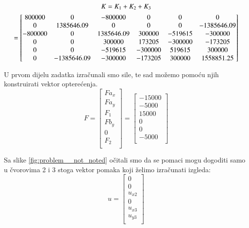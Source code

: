 \documentclass[a4paper,twoside,12pt]{memoir} %
\begin{document}
\begin{gather}
\label{eq:globalna_matrica_krutosti}
    K = K_1 + K_2 + K_3 \notag \\ 
    =
    \begin{bmatrix}
    800000 & 0 & -800000 & 0 & 0 & 0 \\
    0 & 1385646.09 & 0 & 0 & 0 & -1385646.09 \\
    -800000 & 0 & 1385646.09 & 300000 & -519615 & -300000 \\
    0 & 0 & 300000 & 173205 & -300000 & -173205 \\
    0 & 0 & -519615 & -300000 & 519615 & 300000 \\
    0 & -1385646.09 & -300000 & -173205 & 300000 & 1558851.25 \\
    \end{bmatrix}
\end{gather}


U prvom dijelu zadatka izračunali smo sile, te sad možemo pomoću njih konstruirati vektor opterećenja.
\begin{equation}
\label{eq:vektor_opterecenja}
    F =
    \begin{bmatrix}
    Fa_x \\ Fa_y \\ F_1 \\ Fb_y \\ 0 \\ F_2 \\
    \end{bmatrix}
    =
    \begin{bmatrix}
    -15000 \\ -5000 \\ 15000 \\ 0 \\ 0 \\ -5000 \\
    \end{bmatrix}
\end{equation}

Sa slike \ref{fig:problem__not_noted} očitali smo da se pomaci mogu dogoditi samo u čvorovima 2 i 3 stoga vektor pomaka koji želimo izračunati izgleda:
\begin{equation}
\label{eq:vektor_pomaka}
    u =
    \begin{bmatrix}
    0 \\ 0 \\ u_{x2} \\ 0 \\ u_{x3} \\ u_{y3} \\
    \end{bmatrix}
\end{equation}
\end{document}
